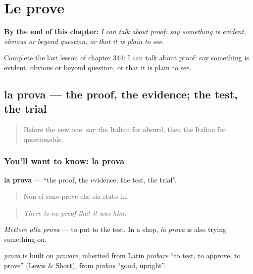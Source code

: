 
\chapter{Le prove}
\label{ch:it-le-prove}

\begin{chapteropening}
\textbf{By the end of this chapter:} \emph{I can talk about proof: say something is evident, obvious or beyond question, or that it is plain to see.}

Complete the last lesson of chapter 344: I can talk about proof: say something is evident, obvious or beyond question, or that it is plain to see.
\end{chapteropening}

\section[la prova]{la prova — the proof, the evidence; the test, the trial}

\label{lesson:IT-C344-prova}



\begin{quote}
Before the new one: say the Italian for absurd, then the Italian for questionable.
\end{quote}

\subsection*{You'll want to know: la prova}
\textbf{la prova} — \textquotedblleft{}the proof, the evidence; the test, the trial\textquotedblright{}.

\begin{quote}
Non ci sono prove che sia stato lui.
\end{quote}

\begin{quote}
\emph{There is no proof that it was him.}
\end{quote}

\emph{Mettere alla prova} — to put to the test. In a shop, \emph{la prova} is also trying something on.

\begin{cousinweb}
\emph{prova} is built on \emph{provare}, inherited from Latin \emph{probāre} \textquotedblleft{}to test, to approve, to prove\textquotedblright{} (Lewis \& Short), from \emph{probus} \textquotedblleft{}good, upright\textquotedblright{}.
\end{cousinweb}

